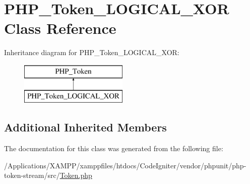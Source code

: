 \hypertarget{class_p_h_p___token___l_o_g_i_c_a_l___x_o_r}{}\section{P\+H\+P\+\_\+\+Token\+\_\+\+L\+O\+G\+I\+C\+A\+L\+\_\+\+X\+OR Class Reference}
\label{class_p_h_p___token___l_o_g_i_c_a_l___x_o_r}
Inheritance diagram for P\+H\+P\+\_\+\+Token\+\_\+\+L\+O\+G\+I\+C\+A\+L\+\_\+\+X\+OR\+:\begin{figure}[H]
\begin{center}
\leavevmode
\includegraphics[height=2.000000cm]{class_p_h_p___token___l_o_g_i_c_a_l___x_o_r}
\end{center}
\end{figure}
\subsection*{Additional Inherited Members}


The documentation for this class was generated from the following file\+:\begin{DoxyCompactItemize}
\item 
/\+Applications/\+X\+A\+M\+P\+P/xamppfiles/htdocs/\+Code\+Igniter/vendor/phpunit/php-\/token-\/stream/src/\mbox{\hyperlink{_token_8php}{Token.\+php}}\end{DoxyCompactItemize}

